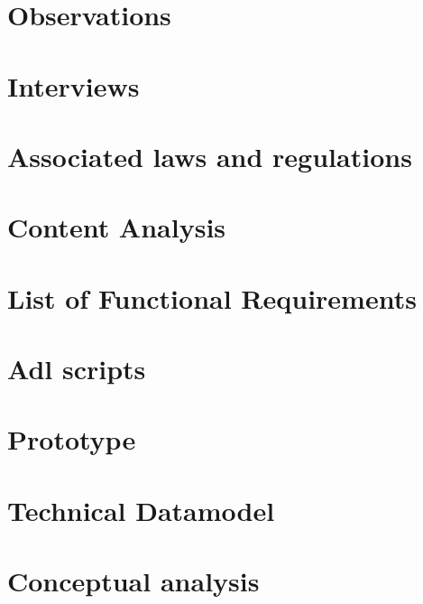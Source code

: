 \newpage
\appendix

\section{Observations} \label{appendixLoglines}

%
%
%
%


\newpage
\section{Interviews}\label{appendixInterviews}


\newpage
\section{Associated laws and regulations}\label{list:ass-laws-regulations}


\newpage
\section{Content Analysis}\label{appendixContentAnalysis}


\newpage
\section{List of Functional Requirements}\label{appendix-functiontal-requirements}


\newpage
\section{Adl scripts}\label{appendixAdl}


\newpage
\section{Prototype}\label{appendixPrototype}


\newpage
\section{Technical Datamodel}\label{appendixTechDatamodel}



\newpage
\section{Conceptual analysis}\label{ConceptualAnalysis}



